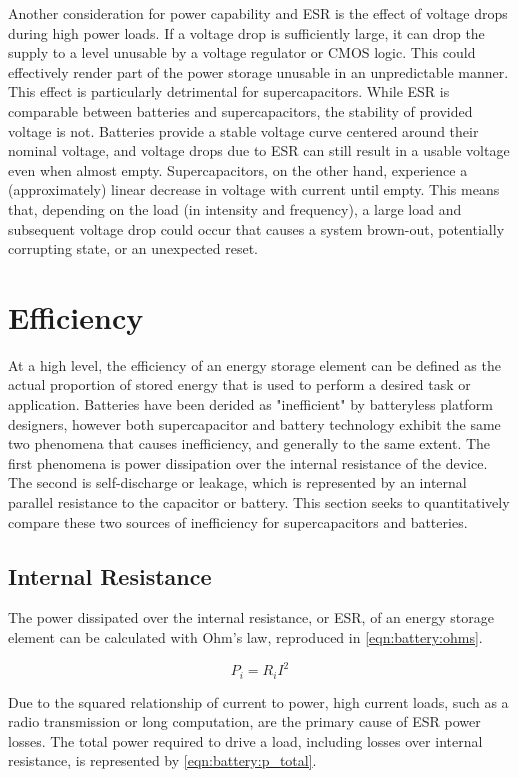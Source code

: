 Another consideration for power capability and ESR is the effect of voltage drops during high power loads. If a voltage drop is sufficiently large, it can drop the supply to a level unusable by a voltage regulator or CMOS logic. This could effectively render part of the power storage unusable in an unpredictable manner. This effect is particularly detrimental for supercapacitors. While ESR is comparable between batteries and supercapacitors, the stability of provided voltage is not. Batteries provide a stable voltage curve centered around their nominal voltage, and voltage drops due to ESR can still result in a usable voltage even when almost empty. Supercapacitors, on the other hand, experience a (approximately) linear decrease in voltage with current until empty. This means that, depending on the load (in intensity and frequency), a large load and subsequent voltage drop could occur that causes a system brown-out, potentially corrupting state, or an unexpected reset. 


\section{Efficiency}
\label{sec:supercapvbattery}
At a high level, the efficiency of an energy storage element can be defined as the actual proportion of stored energy that is used to perform a desired task or application. Batteries have been derided as "inefficient" by batteryless platform designers, however
both supercapacitor and battery technology exhibit the same two phenomena that causes inefficiency, and generally to the same extent. 
The first phenomena is power dissipation over the internal resistance of the device. The second is self-discharge or leakage, which is represented by an internal parallel resistance to the capacitor or battery.
This section seeks to quantitatively compare these two sources of inefficiency for supercapacitors and batteries.

\subsection{Internal Resistance}
The power dissipated over the internal resistance, or ESR, of an energy storage element can be calculated with Ohm's law, reproduced in \cref{eqn:battery:ohms}. 

\begin{equation}\label{eqn:battery:ohms}
P_{i} = R_{i} I^2
\end{equation}

\noindent Due to the squared relationship of current to power, high current loads, such as a radio transmission or long computation, are the primary cause of ESR power losses. The total power required to drive a load, including losses over internal resistance, is represented by \cref{eqn:battery:p_total}. 

